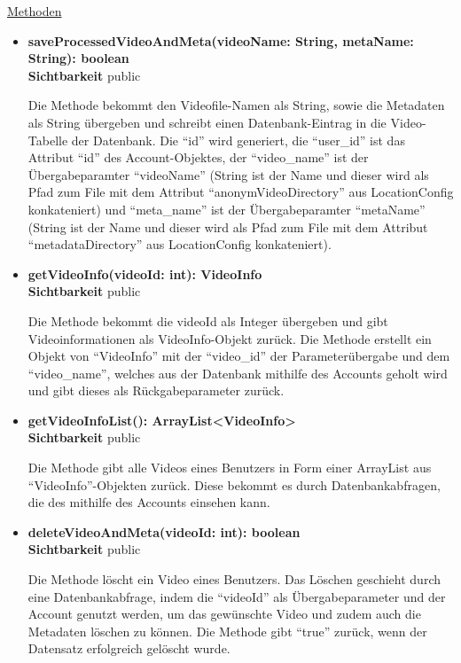\underline{Methoden}
\begin{itemize}
\itemsep0pt
\item \textbf{saveProcessedVideoAndMeta(videoName: String, metaName: String): boolean}\hfill\\
\textbf{Sichtbarkeit} public

Die Methode bekommt den Videofile-Namen als String, sowie die Metadaten als String übergeben und schreibt einen Datenbank-Eintrag in die Video-Tabelle der Datenbank. Die ``id'' wird generiert, die ``user\_id'' ist das Attribut ``id'' des Account-Objektes, der ``video\_name'' ist der Übergabeparamter ``videoName'' (String ist der Name und dieser wird als Pfad zum File mit dem Attribut ``anonymVideoDirectory'' aus LocationConfig konkateniert) und ``meta\_name'' ist der Übergabeparamter ``metaName'' (String ist der Name und dieser wird als Pfad zum File mit dem Attribut ``metadataDirectory'' aus LocationConfig konkateniert). 

\item \textbf{getVideoInfo(videoId: int): VideoInfo}\hfill\\
\textbf{Sichtbarkeit} public

Die Methode bekommt die videoId als Integer übergeben und gibt Videoinformationen als VideoInfo-Objekt zurück. Die Methode erstellt ein Objekt von ``VideoInfo'' mit der ``video\_id'' der Parameterübergabe und dem ``video\_name'', welches aus der Datenbank mithilfe des Accounts geholt wird und gibt dieses als Rückgabeparameter zurück.

\item \textbf{getVideoInfoList(): ArrayList<VideoInfo>}\hfill\\
\textbf{Sichtbarkeit} public

Die Methode gibt alle Videos eines Benutzers in Form einer ArrayList aus ``VideoInfo''-Objekten zurück. Diese bekommt es durch Datenbankabfragen, die des mithilfe des Accounts einsehen kann.

\item \textbf{deleteVideoAndMeta(videoId: int): boolean}\hfill\\
\textbf{Sichtbarkeit} public

Die Methode löscht ein Video eines Benutzers. Das Löschen geschieht durch eine Datenbankabfrage, indem die ``videoId'' als Übergabeparameter und der Account genutzt werden, um das gewünschte Video und zudem auch die Metadaten löschen zu können. Die Methode gibt ``true'' zurück, wenn der Datensatz erfolgreich gelöscht wurde.  


\end{itemize}
